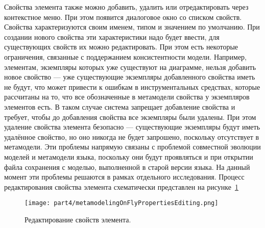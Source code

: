 Свойства элемента также можно добавить, удалить или отредактировать через контекстное 
меню. При этом появится диалоговое окно со списком свойств. Свойства характеризуются 
своим именем, типом и значением по умолчанию. При создании нового свойства эти характеристики 
надо будет ввести, для существующих свойств их можно редактировать. При этом есть 
некоторые ограничения, связанные с поддержанием консистентности модели. Например, 
элементам, экземпляры которых уже существуют на диаграмме, нельзя добавить новое свойство 
--- уже существующие экземпляры добавленного свойства иметь не будут, что может привести 
к ошибкам в инструментальных средствах, которые рассчитаны на то, что все обозначенные 
в метамодели свойства у экземпляров элементов есть. В таком случае система запрещает 
добавление свойства и требует, чтобы до добавления свойства все экземпляры были удалены. 
При этом удаление свойства элемента безопасно --- существующие экземпляры будут иметь 
удалённое свойство, но оно никогда не будет запрошено, поскольку отсутствует в метамодели. 
Эти проблемы напрямую связаны с проблемой совместной эволюции моделей и метамодели языка, 
поскольку они будут проявляться и при открытии файла сохранения с моделью, выполненной в 
старой версии языка. На данный момент эти проблемы решаются в рамках отдельного исследования. 
Процесс редактирования свойства элемента схематически представлен на рисунке~\ref{image:metamodelingOnFlyPropertiesEditing}

\begin{figure} [ht]
	\begin{center}
		\texttt{[image: part4/metamodelingOnFlyPropertiesEditing.png]}
		\caption{Редактирование свойств элемента.}
		\label{image:metamodelingOnFlyPropertiesEditing}
	\end{center}
\end{figure}
